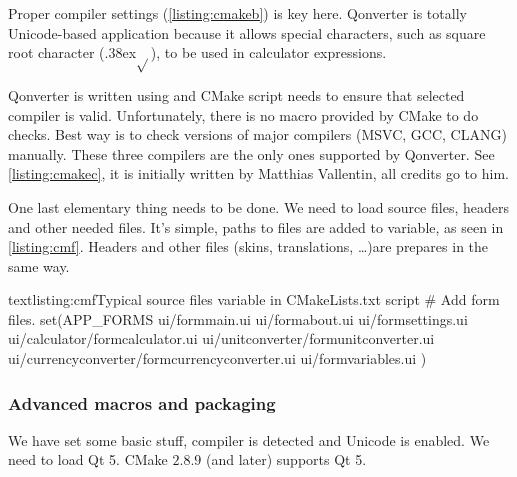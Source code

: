 Proper compiler settings (\autoref{listing:cmakeb}) is key here. Qonverter is totally Unicode-based application because it allows special characters, such as square root character ({\raise.38ex\hbox{$\sqrt{ }$}}), to be used in calculator expressions.


Qonverter is written using  and CMake script needs to ensure that selected compiler is valid. Unfortunately, there is no macro provided by CMake to do  checks. Best way is to check versions of major compilers (MSVC, GCC, CLANG) manually. These three compilers are the only ones supported by Qonverter. See \autoref{listing:cmakec}, it is initially written by Matthias Vallentin, all credits go to him.

One last elementary thing needs to be done. We need to load source files, headers and other needed files. It's simple, paths to files are added to variable, as seen in \autoref{listing:cmf}. Headers and other files (skins, translations, \ldots)are prepares in the same way.

\begin{fdoccode}{text}{listing:cmf}{Typical source files variable in CMakeLists.txt script}
# Add form files.
set(APP_FORMS
    ui/formmain.ui
    ui/formabout.ui
    ui/formsettings.ui
    ui/calculator/formcalculator.ui
    ui/unitconverter/formunitconverter.ui
    ui/currencyconverter/formcurrencyconverter.ui
    ui/formvariables.ui
)
\end{fdoccode}

\subsubsection{Advanced macros and packaging}
We have set some basic stuff, compiler is detected and Unicode is enabled. We need to load Qt 5. CMake $2.8.9$ (and later) supports Qt 5.

